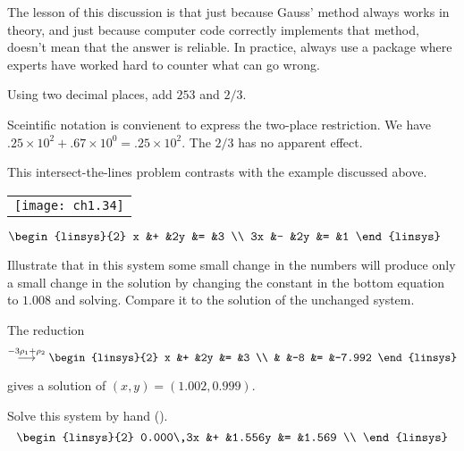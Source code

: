The lesson of this discussion is that
just because Gauss' method always works in theory, and just
because computer code correctly implements that method,
doesn't mean that the answer is reliable.
In practice, always use a package
where experts have worked hard to counter what can go wrong.

\begin{exercises}
  \item 
    Using two decimal places, add $253$ and $2/3$.
    \begin{answer}
      Sceintific notation is convienent to express the two-place restriction.
      We have $.25\times 10^{2}+.67\times 10^{0}=.25\times 10^{2}$.
      The $2/3$ has no apparent effect.
    \end{answer}
  \item 
    This intersect-the-lines problem contrasts with the example
    discussed above.
    \begin{center}
      \begin{tabular}{@{}c@{}}
        \texttt{[image: ch1.34]}
      \end{tabular}
      \qquad
      $\displaystyle \begin{linsys}{2}
            x &+ &2y &= &3  \\
            3x &- &2y &= &1
      \end{linsys}$
    \end{center}
    Illustrate that in this system 
    some small change in the numbers will produce only a
    small change in the solution by changing the constant in the
    bottom equation to $1.008$ and solving.
    Compare it to the solution of the unchanged system.
    \begin{answer}
      The reduction
      \begin{equation*}
        \grstep{-3\rho_1+\rho_2}
        \begin{linsys}{2}
          x  &+  &2y  &=  &3  \\
             &   &-8  &=  &-7.992
        \end{linsys}
      \end{equation*}
      gives a solution of \( (x,y)=(1.002,0.999) \).
    \end{answer}
  \item 
    Solve this system by hand (\cite{Rice}).
    \begin{equation*}
      \begin{linsys}{2}
        0.000\,3x  &+  &1.556y  &=  &1.569 \\

\end{linsys}
\end{equation*}
\end{exercises}
